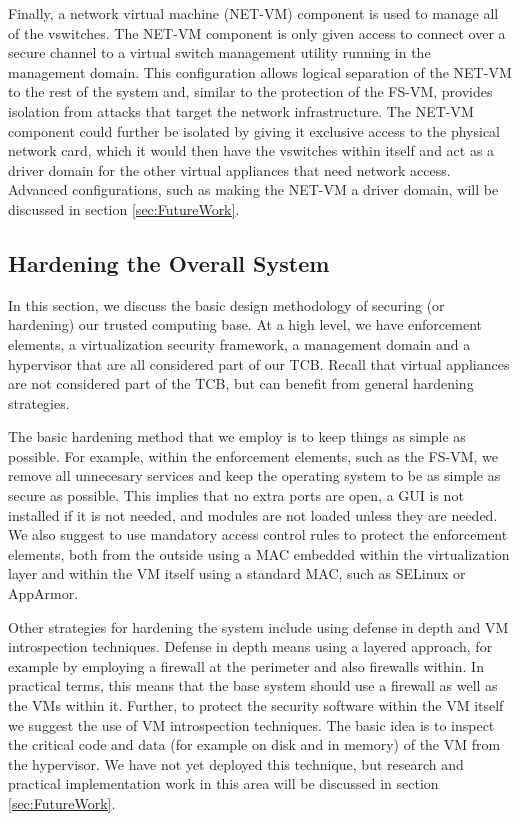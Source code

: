 Finally, a network virtual machine (NET-VM) component is used to manage all of the vswitches. The NET-VM component is only given access to connect over a secure channel to a virtual switch management utility running in the management domain. This configuration allows logical separation of the NET-VM to the rest of the system and, similar to the protection of the FS-VM, provides isolation from attacks that target the network infrastructure. The NET-VM component could further be isolated by giving it exclusive access to the physical network card, which it would then have the vswitches within itself and act as a driver domain for the other virtual appliances that need network access. Advanced configurations, such as making the NET-VM a driver domain, will be discussed in section \ref{sec:FutureWork}.

\subsection{Hardening the Overall System}

In this section, we discuss the basic design methodology of securing (or hardening) our trusted computing base. At a high level, we have enforcement elements, a virtualization security framework, a management domain and a hypervisor that are all considered part of our TCB. Recall that virtual appliances are not considered part of the TCB, but can benefit from general hardening strategies.

The basic hardening method that we employ is to keep things as simple as possible. For example, within the enforcement elements, such as the FS-VM, we remove all unnecesary services and keep the operating system to be as simple as secure as possible. This implies that no extra ports are open, a GUI is not installed if it is not needed, and modules are not loaded unless they are needed. We also suggest to use mandatory access control rules to protect the enforcement elements, both from the outside using a MAC embedded within the virtualization layer and within the VM itself using a standard MAC, such as SELinux or AppArmor.

Other strategies for hardening the system include using defense in depth and VM introspection techniques. Defense in depth means using a layered approach, for example by employing a firewall at the perimeter and also firewalls within. In practical terms, this means that the base system should use a firewall as well as the VMs within it. Further, to protect the security software within the VM itself we suggest the use of VM introspection techniques. The basic idea is to inspect the critical code and data (for example on disk and in memory) of the VM from the hypervisor. We have not yet deployed this technique, but research and practical implementation work in this area will be discussed in section \ref{sec:FutureWork}.

